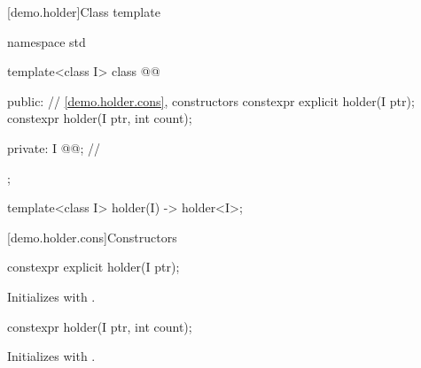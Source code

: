 [demo.holder]{Class template }

\begin{codeblock}
namespace std {
  template<class I>
  class @@ {
  public:
    // \ref{demo.holder.cons}, constructors
    constexpr explicit holder(I ptr);
    constexpr holder(I ptr, int count);

  private:
    I @@; // \expos
  };

  template<class I> holder(I) -> holder<I>;
}
\end{codeblock}

[demo.holder.cons]{Constructors}

%
\begin{itemdecl}
constexpr explicit holder(I ptr);
\end{itemdecl}

\begin{itemdescr}
\pnum
\effects
Initializes  with .
\end{itemdescr}

%
\begin{itemdecl}
constexpr holder(I ptr, int count);
\end{itemdecl}

\begin{itemdescr}
\pnum
\effects
Initializes  with .
\end{itemdescr}
